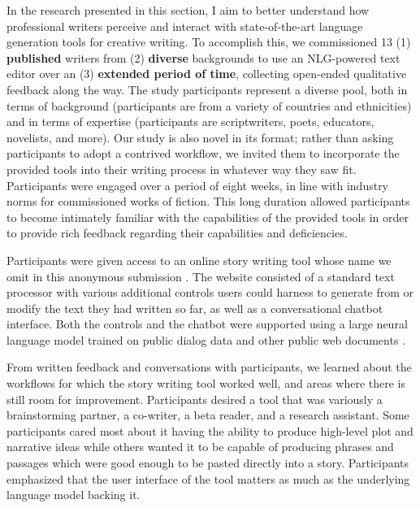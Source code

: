 
In the research presented in this section, I aim to better understand how professional writers perceive and interact with state-of-the-art language generation tools for creative writing.
To accomplish this, we commissioned 13 (1) \textbf{published} writers from (2) \textbf{diverse} backgrounds to use an NLG-powered text editor over an (3) \textbf{extended period of time}, collecting open-ended qualitative feedback along the way.
The study participants represent a diverse pool, both in terms of background (participants are from a variety of countries and ethnicities) and in terms of expertise (participants are scriptwriters, poets, educators, novelists, and more).
Our study is also novel in its format; rather than asking participants to adopt a contrived workflow, we invited them to incorporate the provided tools into their writing process in whatever way they saw fit.
Participants were engaged over a period of eight weeks, in line with industry norms for commissioned works of fiction.
This long duration allowed participants to become intimately familiar with the capabilities of the provided tools in order to provide rich feedback regarding their capabilities and deficiencies.

Participants were given access to an online story writing tool whose name we omit in this anonymous submission \citep{yuan2022wordcraft}.
The website consisted of a standard text processor with various additional controls users could harness to generate from or modify the text they had written so far, as well as a conversational chatbot interface.
Both the controls and the chatbot were supported using a large neural language model trained on public dialog data and other public web documents \citep{thoppilan2022lamda}.

From written feedback and conversations with participants, we learned about the workflows for which the story writing tool worked well, and areas where there is still room for improvement.
Participants desired a tool that was variously a brainstorming partner, a co-writer, a beta reader, and a research assistant.
Some participants cared most about it having the ability to produce high-level plot and narrative ideas while others wanted it to be capable of producing phrases and passages which were good enough to be pasted directly into a story.
Participants emphasized that the user interface of the tool matters as much as the underlying language model backing it.



